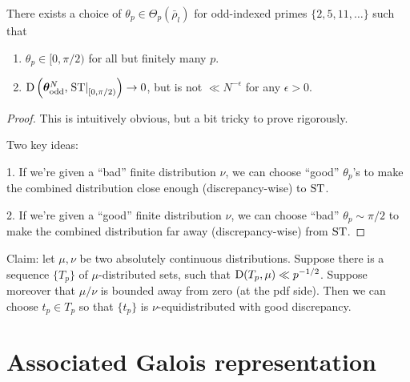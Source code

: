 \begin{theorem}
There exists a choice of $\theta_p\in \Theta_p(\bar\rho_l)$ for odd-indexed 
primes $\{2,5,11,\dots\}$ such that 
\begin{enumerate}
\item
$\theta_p\in [0,\pi/2)$ for all but finitely many $p$. 

\item
$\operatorname{D}\left({\boldsymbol\theta}_{\mathrm{odd}}^N, \left.\mathrm{ST}\right|_{[0,\pi/2)}\right) \to 0$, 
but is not $\ll N^{-\epsilon}$ for any $\epsilon>0$. 
\end{enumerate}
\end{theorem}
\begin{proof}
This is intuitively obvious, but a bit tricky to prove rigorously. 

Two key ideas: 

1. If we're given a ``bad'' finite distribution $\nu$, we can choose ``good'' 
$\theta_p$'s to make the combined distribution close enough (discrepancy-wise) 
to $\mathrm{ST}$. 

2. If we're given a ``good'' finite distribution $\nu$, we can choose ``bad'' 
$\theta_p\sim \pi/2$ to make the combined distribution far away 
(discrepancy-wise) from $\mathrm{ST}$. 
\end{proof}

Claim: let $\mu,\nu$ be two absolutely continuous distributions. Suppose there 
is a sequence $\{T_p\}$ of $\mu$-distributed sets, such that 
$\operatorname{D}(T_p,\mu) \ll p^{-1/2}$. Suppose moreover that $\mu/\nu$ is bounded away 
from zero (at the pdf side). Then we can choose $t_p\in T_p$ so that 
$\{t_p\}$ is $\nu$-equidistributed with good discrepancy. 





\section{Associated Galois representation}
